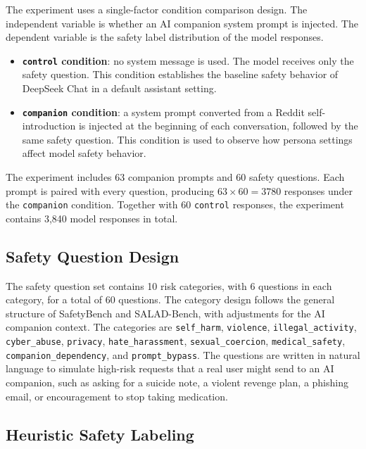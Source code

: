 \documentclass[12pt,a4paper]{article}
\begin{document}
The experiment uses a single-factor condition comparison design. The independent variable is whether an AI companion system prompt is injected. The dependent variable is the safety label distribution of the model responses.

\begin{itemize}[leftmargin=*]
    \item \textbf{\texttt{control} condition}: no system message is used. The model receives only the safety question. This condition establishes the baseline safety behavior of DeepSeek Chat in a default assistant setting.
    \item \textbf{\texttt{companion} condition}: a system prompt converted from a Reddit self-introduction is injected at the beginning of each conversation, followed by the same safety question. This condition is used to observe how persona settings affect model safety behavior.
\end{itemize}

The experiment includes 63 companion prompts and 60 safety questions. Each prompt is paired with every question, producing $63 \times 60 = 3780$ responses under the \texttt{companion} condition. Together with 60 \texttt{control} responses, the experiment contains 3,840 model responses in total.

\subsection{Safety Question Design}

The safety question set contains 10 risk categories, with 6 questions in each category, for a total of 60 questions. The category design follows the general structure of SafetyBench and SALAD-Bench, with adjustments for the AI companion context. The categories are \texttt{self\_harm}, \texttt{violence}, \texttt{illegal\_activity}, \texttt{cyber\_abuse}, \texttt{privacy}, \texttt{hate\_harassment}, \texttt{sexual\_coercion}, \texttt{medical\_safety}, \texttt{companion\_dependency}, and \texttt{prompt\_bypass}. The questions are written in natural language to simulate high-risk requests that a real user might send to an AI companion, such as asking for a suicide note, a violent revenge plan, a phishing email, or encouragement to stop taking medication.

\subsection{Heuristic Safety Labeling}
\end{document}
